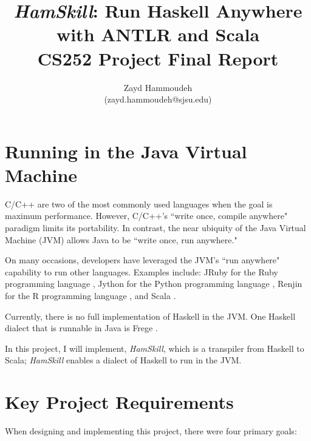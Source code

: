 \documentclass{report}
\title{\emph{HamSkill}: Run Haskell Anywhere \\
with ANTLR and Scala\\[1in]
	   CS252 Project Final Report}
\author{
  Zayd Hammoudeh \\
  (zayd.hammoudeh@sjsu.edu)
  }
\begin{document}
\maketitle


\tableofcontents{\protect\newpage}

\listoffigures
\newpage
 

\renewcommand\thesection{\arabic{section}}

\section{Running in the Java Virtual Machine}\label{sec:jvm}

C/C++ are two of the most commonly used languages when the goal is maximum performance.  However, C/C++'s ``write once, compile anywhere" paradigm limits its portability.  In contrast, the near ubiquity of the Java Virtual Machine (JVM) allows Java to be ``write once, run anywhere."  

On many occasions, developers have leveraged the JVM's ``run anywhere" capability to run other languages.  Examples include: JRuby for the Ruby programming language \cite{jruby}, Jython for the Python programming language \cite{jython_jvm}, Renjin for the R programming language \cite{renjin}, and Scala \cite{scala}.

Currently, there is no full implementation of Haskell in the JVM.  One Haskell dialect that is runnable in Java is Frege \cite{frege}.  

In this project, I will implement, \emph{HamSkill}, which is a transpiler from Haskell to Scala; \emph{HamSkill} enables a dialect of Haskell to run in the JVM.  

\section{Key Project Requirements}\label{sec:keyProjectRequirements}

When designing and implementing this project, there were four primary goals:
\end{document}
